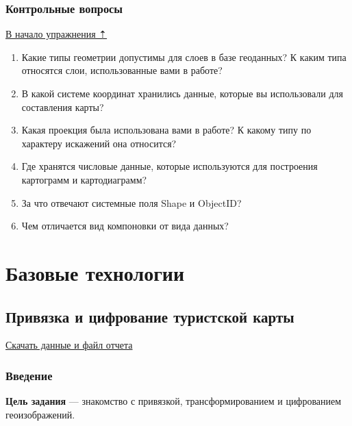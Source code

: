 \documentclass[]{book}
\theoremstyle{definition}
\theoremstyle{definition}
\theoremstyle{definition}
\theoremstyle{remark}
\begin{document}
\hypertarget{map-design-economic-questions}{%
\section{Контрольные вопросы}\label{map-design-economic-questions}}

\protect\hyperlink{map-design-economic}{В начало упражнения ⇡}

\begin{enumerate}
\def\labelenumi{\arabic{enumi}.}
\item
  Какие типы геометрии допустимы для слоев в базе геоданных? К каким
  типа относятся слои, использованные вами в работе?
\item
  В какой системе координат хранились данные, которые вы использовали
  для составления карты?
\item
  Какая проекция была использована вами в работе? К какому типу по
  характеру искажений она относится?
\item
  Где хранятся числовые данные, которые используются для построения
  картограмм и картодиаграмм?
\item
  За что отвечают системные поля Shape и ObjectID?
\item
  Чем отличается вид компоновки от вида данных?
\end{enumerate}

\hypertarget{part--}{%
\part{Базовые технологии}\label{part--}}

\hypertarget{map-ref-general}{%
\chapter{Привязка и цифрование туристской карты}\label{map-ref-general}}

\href{http://autolab.geogr.msu.ru/gis/data/Ex05.zip}{Скачать данные и
файл отчета}

\hypertarget{map-ref-general-intro}{%
\section{Введение}\label{map-ref-general-intro}}

\textbf{Цель задания} --- знакомство с привязкой, трансформированием и
цифрованием геоизображений.
\end{document}
